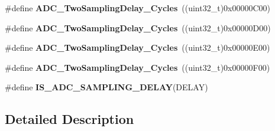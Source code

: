 \begin{DoxyCompactItemize}
\item 
\hypertarget{group___a_d_c__delay__between__2__sampling__phases_gaea74e18e420d600ea8a4c526f817f94d}{\#define {\bfseries A\-D\-C\-\_\-\-Two\-Sampling\-Delay\-\_\-Cycles}~((uint32\-\_\-t)0x00000\-C00)}\label{group___a_d_c__delay__between__2__sampling__phases_gaea74e18e420d600ea8a4c526f817f94d}

\item 
\hypertarget{group___a_d_c__delay__between__2__sampling__phases_gafeb801458d51f19e77ca6427126b4f35}{\#define {\bfseries A\-D\-C\-\_\-\-Two\-Sampling\-Delay\-\_\-Cycles}~((uint32\-\_\-t)0x00000\-D00)}\label{group___a_d_c__delay__between__2__sampling__phases_gafeb801458d51f19e77ca6427126b4f35}

\item 
\hypertarget{group___a_d_c__delay__between__2__sampling__phases_ga4a061cfb253b78537a899d7c49d5fb16}{\#define {\bfseries A\-D\-C\-\_\-\-Two\-Sampling\-Delay\-\_\-Cycles}~((uint32\-\_\-t)0x00000\-E00)}\label{group___a_d_c__delay__between__2__sampling__phases_ga4a061cfb253b78537a899d7c49d5fb16}

\item 
\hypertarget{group___a_d_c__delay__between__2__sampling__phases_gaf3b87ecc73e218042a64780ca3439d26}{\#define {\bfseries A\-D\-C\-\_\-\-Two\-Sampling\-Delay\-\_\-Cycles}~((uint32\-\_\-t)0x00000\-F00)}\label{group___a_d_c__delay__between__2__sampling__phases_gaf3b87ecc73e218042a64780ca3439d26}

\item 
\#define {\bfseries I\-S\-\_\-\-A\-D\-C\-\_\-\-S\-A\-M\-P\-L\-I\-N\-G\-\_\-\-D\-E\-L\-A\-Y}(D\-E\-L\-A\-Y)
\end{DoxyCompactItemize}


\subsection{Detailed Description}


